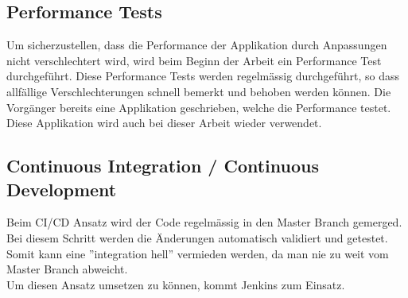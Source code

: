 \subsection{Performance Tests}
Um sicherzustellen, dass die Performance der Applikation durch Anpassungen nicht verschlechtert wird, wird beim Beginn der Arbeit ein Performance Test durchgeführt. Diese Performance Tests werden regelmässig durchgeführt, so dass allfällige Verschlechterungen schnell bemerkt und behoben werden können. Die Vorgänger bereits eine Applikation geschrieben, welche die Performance testet. Diese Applikation wird auch bei dieser Arbeit wieder verwendet. 

\subsection{Continuous Integration / Continuous Development}
Beim CI/CD Ansatz wird der Code regelmässig in den Master Branch gemerged. Bei diesem Schritt werden die Änderungen automatisch validiert und getestet. Somit kann eine ''integration hell'' vermieden werden, da man nie zu weit vom Master Branch abweicht. \\
Um diesen Ansatz umsetzen zu können, kommt Jenkins zum Einsatz.
\newpage